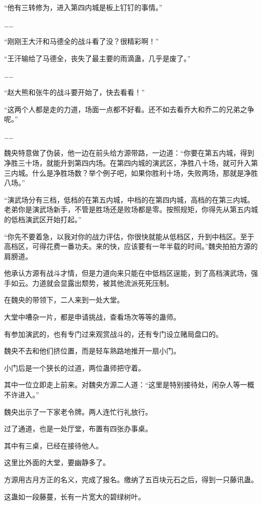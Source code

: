 \begin{this_body}
“他有三转修为，进入第四内城是板上钉钉的事情。”

……

“刚刚王大汗和马德全的战斗看了没？很精彩啊！”

“王汗输给了马德全，丧失了最主要的雨滴蛊，几乎是废了。”

……

“赵大熊和张牛的战斗要开始了，快去看看！”

“这两个人都是走的力道，场面一点都不好看。还不如去看乔大和乔二的兄弟之争呢。”

……

魏央特意做了伪装，他一边在前头给方源带路，一边道：“你要在第五内城，得到净胜三十场，就能升到第四内场。在第四内城的演武区，净胜八十场，就可升入第三内城。什么是净胜场数？举个例子吧，如果你胜利十场，失败两场，那就是净胜八场。”

“演武场分有三档，低档的在第五内城，中档的在第四内城，高档的在第三内城。老弟你是演武场新手，不管是胜场还是败场都是零。按照规矩，你得先从第五内城的低档演武区开始打起。”

“你先不要着急，以我对你的战力评估，你很快就能从低档区，升到中档区。至于高档区，可得花费一番功夫。来的快，应该要有一年半载的时间。”魏央拍拍方源的肩膀道。

他承认方源有战斗才情，但是力道向来只能在中低档区逞能，到了高档演武场，强手如云。力道就会显露出颓势，被其他流派死死压制。

在魏央的带领下，二人来到一处大堂。

大堂中嘈杂一片，都是申请挑战，查看场次等等的蛊师。

有参加演武的，也有专门过来观赏战斗的，还有专门设立赌局盘口的。

魏央不去和他们挤位置，而是轻车熟路地推开一扇小门。

小门后是一个狭长的过道，两位蛊师把守着。

其中一位立即走上前来。对魏央方源二人道：“这里是特别接待处，闲杂人等一概不许进入。”

魏央出示了一下家老令牌。两人连忙行礼放行。

过了通道，也是一处厅堂，布置有四张办事桌。

其中有三桌，已经在接待他人。

这里比外面的大堂，要幽静多了。

方源用古月方正的名义，完成了报名。缴纳了五百块元石之后，得到一只藤讯蛊。

这蛊如一段藤蔓，长有一片宽大的碧绿树叶。


\end{this_body}
